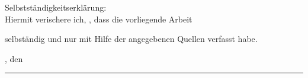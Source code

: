 \clearpage
{}

Selbstständigkeitserklärung:
\\Hiermit verischere ich, \autorName, dass die vorliegende Arbeit 
\begin{quote}
\textit{\kompletterTitel}
\end{quote}
selbständig und nur mit Hilfe der angegebenen Quellen verfasst habe.

\abgabeOrt, den \abgabeTermin


\rule[-0.2cm]{5.5cm}{0.5pt}

\textsc{\autorName}
\clearpage